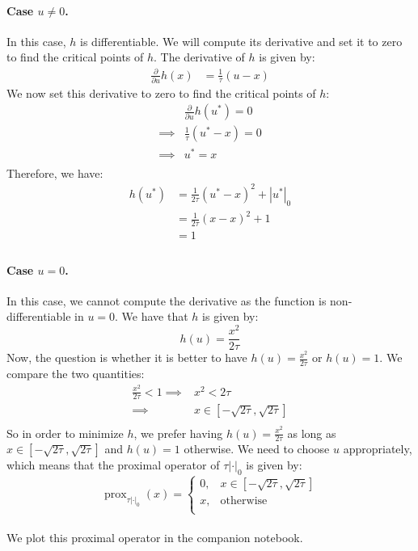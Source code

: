 \documentclass[12pt]{article}
\newcommand{\prox}{\operatorname{prox}}
\begin{document}
\paragraph{Case $u \neq 0$.}
In this case, $h$ is differentiable. We will compute its derivative and set it to zero to find the critical points of $h$. The derivative of $h$ is given by:
\begin{align*}
  \frac{\partial}{\partial u} h(x)
   & = \frac{1}{\tau} (u-x)
\end{align*}
We now set this derivative to zero to find the critical points of $h$:
\begin{align*}
           &
  \frac{\partial}{\partial u}  h(u^*) = 0 \\
  \implies &
  \frac{1}{\tau} (u^*-x) = 0              \\
  \implies &
  u^* = x                                 \\
\end{align*}
Therefore, we have:
\begin{align*}
  h(u^*)
   & = \frac{1}{2\tau}\left(u^* - x \right)^2 + |u^*|_0 \\
   & = \frac{1}{2\tau}\left(x - x \right)^2 + 1         \\
   & = 1                                                \\
\end{align*}
\paragraph{Case $u = 0$.}
In this case, we cannot compute the derivative as the function is non-differentiable in $u = 0$. We have that $h$ is given by:
\begin{equation*}
  h(u) = \frac{x^2}{2\tau}
\end{equation*}
Now, the question is whether it is better to have $h(u) = \frac{x^2}{2\tau}$ or $h(u) = 1$. We compare the two quantities:
\begin{align*}
  \frac{x^2}{2\tau} < 1
  \implies &
  x^2 < 2\tau \\
  \implies &
  x \in [-\sqrt{2\tau}, \sqrt{2\tau}]  \\
\end{align*}
So in order to minimize $h$, we prefer having $h(u) = \frac{x^2}{2\tau}$ as long as $x \in [-\sqrt{2\tau}, \sqrt{2\tau}]$ and $h(u) = 1$ otherwise. We need to choose $u$ appropriately, which means that the proximal operator of $\tau |\cdot|_0$ is given by:
\begin{equation*}
  \prox_{\tau |\cdot|_0}(x) = \begin{cases}
    0, & x \in [-\sqrt{2\tau}, \sqrt{2\tau}] \\
    x, & \text{otherwise}                   \\
  \end{cases}
\end{equation*}
\\We plot this proximal operator in the companion notebook.
\end{document}
